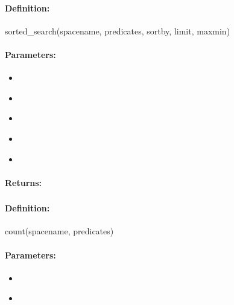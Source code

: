 \paragraph{Definition:}
\begin{rubycode}
sorted_search(spacename, predicates, sortby, limit, maxmin)
\end{rubycode}

\paragraph{Parameters:}
\begin{itemize}[noitemsep]
\item {}\\

\item {}\\

\item {}\\

\item {}\\

\item {}\\

\end{itemize}

\paragraph{Returns:}


\pagebreak
\subsubsection{}
\label{api:ruby:count}


\paragraph{Definition:}
\begin{rubycode}
count(spacename, predicates)
\end{rubycode}

\paragraph{Parameters:}
\begin{itemize}[noitemsep]
\item {}\\

\item {}\\

\end{itemize}

